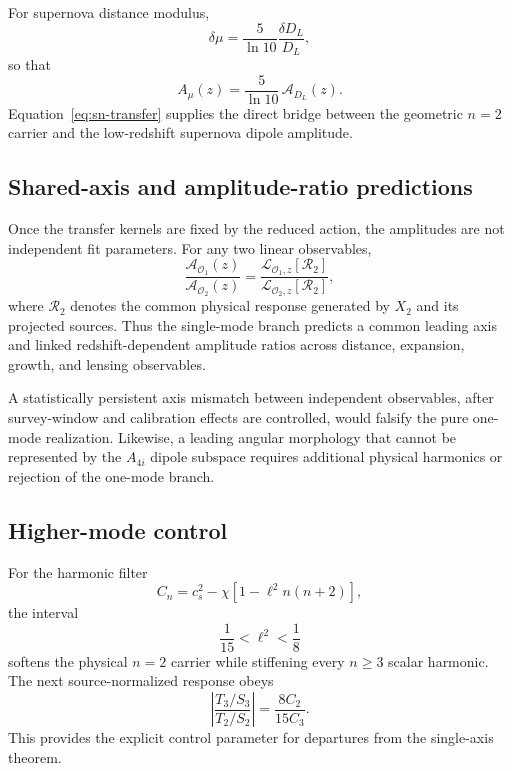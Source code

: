For supernova distance modulus,
\begin{equation}
\delta\mu
=
\frac{5}{\ln 10}
\frac{\delta D_L}{D_L},
\end{equation}
so that
\begin{equation}
\boxed{
A_\mu(z)
=
\frac{5}{\ln 10}\,
\mathcal A_{D_L}(z)
}.
\label{eq:sn-transfer}
\end{equation}
Equation~\eqref{eq:sn-transfer} supplies the direct bridge between the
geometric $n=2$ carrier and the low-redshift supernova dipole amplitude.

\subsection{Shared-axis and amplitude-ratio predictions}

Once the transfer kernels are fixed by the reduced action, the amplitudes are
not independent fit parameters.  For any two linear observables,
\begin{equation}
\frac{
\mathcal A_{\mathcal O_1}(z)
}{
\mathcal A_{\mathcal O_2}(z)
}
=
\frac{
\mathcal L_{\mathcal O_1,z}[\mathcal R_2]
}{
\mathcal L_{\mathcal O_2,z}[\mathcal R_2]
},
\end{equation}
where $\mathcal R_2$ denotes the common physical response generated by
$X_2$ and its projected sources.  Thus the single-mode branch predicts a
common leading axis and linked redshift-dependent amplitude ratios across
distance, expansion, growth, and lensing observables.

A statistically persistent axis mismatch between independent observables,
after survey-window and calibration effects are controlled, would falsify
the pure one-mode realization.  Likewise, a leading angular morphology that
cannot be represented by the $A_{4i}$ dipole subspace requires additional
physical harmonics or rejection of the one-mode branch.

\subsection{Higher-mode control}

For the harmonic filter
\begin{equation}
C_n
=
c_s^2-\chi\left[1-\ell^2n(n+2)\right],
\end{equation}
the interval
\begin{equation}
\frac1{15}<\ell^2<\frac18
\end{equation}
softens the physical $n=2$ carrier while stiffening every $n\ge3$ scalar
harmonic.  The next source-normalized response obeys
\begin{equation}
\left|
\frac{T_3/S_3}{T_2/S_2}
\right|
=
\frac{8C_2}{15C_3}.
\end{equation}
This provides the explicit control parameter for departures from the
single-axis theorem.

